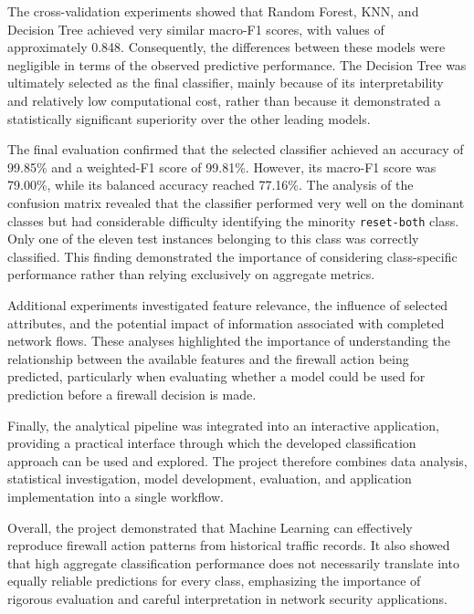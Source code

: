The cross-validation experiments showed that Random Forest, KNN, and Decision Tree achieved very similar macro-F1 scores, with values of approximately 0.848. Consequently, the differences between these models were negligible in terms of the observed predictive performance. The Decision Tree was ultimately selected as the final classifier, mainly because of its interpretability and relatively low computational cost, rather than because it demonstrated a statistically significant superiority over the other leading models.

The final evaluation confirmed that the selected classifier achieved an accuracy of 99.85\% and a weighted-F1 score of 99.81\%. However, its macro-F1 score was 79.00\%, while its balanced accuracy reached 77.16\%. The analysis of the confusion matrix revealed that the classifier performed very well on the dominant classes but had considerable difficulty identifying the minority \texttt{reset-both} class. Only one of the eleven test instances belonging to this class was correctly classified. This finding demonstrated the importance of considering class-specific performance rather than relying exclusively on aggregate metrics.

Additional experiments investigated feature relevance, the influence of selected attributes, and the potential impact of information associated with completed network flows. These analyses highlighted the importance of understanding the relationship between the available features and the firewall action being predicted, particularly when evaluating whether a model could be used for prediction before a firewall decision is made.

Finally, the analytical pipeline was integrated into an interactive application, providing a practical interface through which the developed classification approach can be used and explored. The project therefore combines data analysis, statistical investigation, model development, evaluation, and application implementation into a single workflow.

Overall, the project demonstrated that Machine Learning can effectively reproduce firewall action patterns from historical traffic records. It also showed that high aggregate classification performance does not necessarily translate into equally reliable predictions for every class, emphasizing the importance of rigorous evaluation and careful interpretation in network security applications.





